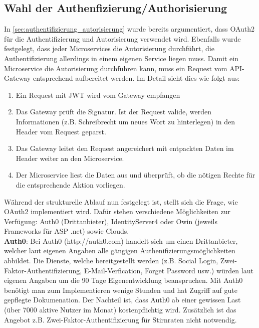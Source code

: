 {\subsection{Wahl der Authenfizierung/Authorisierung} \label{sec:concept_authentifizierung_autorisierung}

In \ref{sec:authentifizierung_autorisierung} wurde bereits argumentiert, dass OAuth2 für die Authentifizierung und Autorisierung verwendet wird. Ebenfalls wurde festgelegt, dass jeder Microservices die Autorisierung durchführt, die Authentifizierung allerdings in einem eigenen Service liegen muss. Damit ein Microservice die Autorisierung durchführen kann, muss ein Request vom API-Gateway entsprechend aufbereitet werden. Im Detail sieht dies wie folgt aus\cite{richardson2019mic_pattern}:\\
\begin{enumerate}
	\item  Ein Request mit JWT wird vom Gateway empfangen
	\item Das Gateway prüft die Signatur. Ist der Request valide, werden Informationen (z.B. Schreibrecht um neues Wort zu hinterlegen) in den Header vom Request geparst. 
	\item Das Gateway leitet den Request angereichert mit entpackten Daten im Header weiter an den Microservice.
	\item Der Microservice liest die Daten aus und überprüft, ob die nötigen Rechte für die entsprechende Aktion vorliegen.
\end{enumerate}

Während der strukturelle Ablauf nun festgelegt ist, stellt sich die Frage, wie OAuth2 implementiert wird. Dafür stehen verschiedene Möglichkeiten zur Verfügung: Auth0 (Drittanbieter), IdentityServer4 oder Owin (jeweils Frameworks für ASP .net) sowie Clouds.\\

\textbf{Auth0}: Bei Auth0 (http://auth0.com) handelt sich um einen Drittanbieter, welcher laut eigenen Angaben alle gängigen Authenifizierungsmöglichkeiten abbildet. Die Dienste, welche bereitgestellt werden (z.B. Social Login, Zwei-Faktor-Authentifizierung, E-Mail-Verfication, Forget Password usw.) würden laut eigenen Angaben um die 90 Tage Eigenentwicklung beanspruchen. Mit Auth0 benötigt man zum Implementieren wenige Stunden und hat Zugriff auf gute gepflegte Dokumenation. Der Nachteil ist, dass Auth0 ab einer gewissen Last (über 7000 aktive Nutzer im Monat) kostenpflichtig wird. Zusätzlich ist das Angebot z.B. Zwei-Faktor-Authentifizierung für Stirnraten nicht notwendig.\\

}
